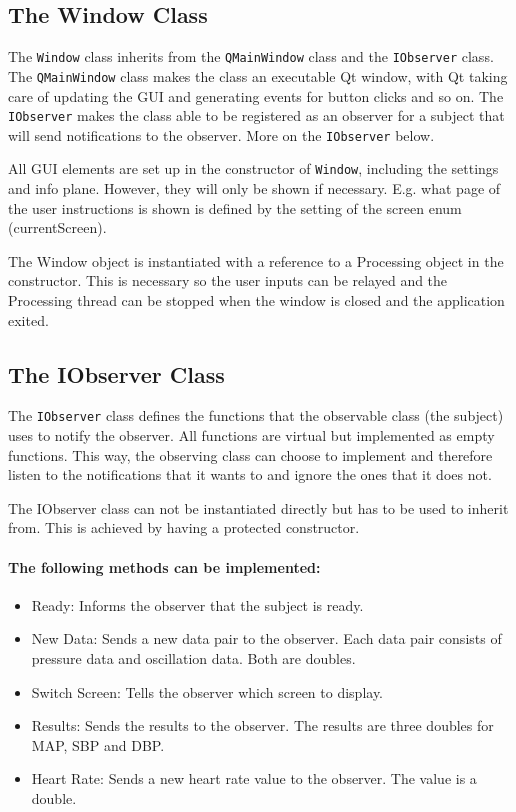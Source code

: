 \subsection{The Window Class}
The \texttt{Window} class inherits from the \texttt{QMainWindow} class and the \texttt{IObserver} class. The \texttt{QMainWindow} class makes the class an executable Qt window, with Qt taking care of updating the GUI and generating events for button clicks and so on. The \texttt{IObserver} makes the class able to be registered as an observer for a subject that will send notifications to the observer. More on the \texttt{IObserver} below.

All GUI elements are set up in the constructor of  \texttt{Window}, including the settings and info plane. However, they will only be shown if necessary. E.g. what page of the user instructions is shown is defined by the setting of the screen enum (currentScreen).

The Window object is instantiated with a reference to a Processing object in the constructor. This is necessary so the user inputs can be relayed and the Processing thread can be stopped when the window is closed and the application exited. 

\subsection{The IObserver Class}
The \texttt{IObserver} class defines the functions that the observable class (the subject) uses to notify the observer. All functions are virtual but implemented as empty functions. This way, the observing class can choose to implement and therefore listen to the notifications that it wants to and ignore the ones that it does not. 

The IObserver class can not be instantiated directly but has to be used to inherit from. This is achieved by having a protected constructor.

\paragraph{The following methods can be implemented:}
\begin{itemize}[noitemsep]
\item Ready: \newline
Informs the observer that the subject is ready.
\item New Data: \newline
Sends a new data pair to the observer. Each data pair consists of pressure data and oscillation data. Both are doubles.
\item Switch Screen: \newline
Tells the observer which screen to display.
\item Results: \newline
Sends the results to the observer. The results are three doubles for MAP, SBP and DBP.
\item Heart Rate: \newline
Sends a new heart rate value to the observer. The value is a double.
\end{itemize}

